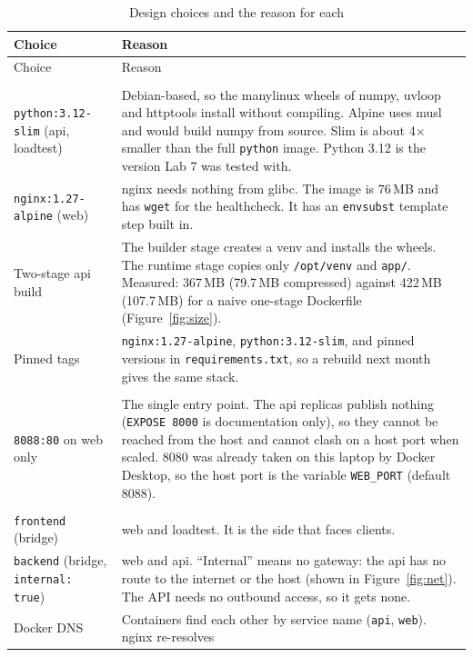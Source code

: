 \documentclass[11pt,a4paper]{article}
\begin{document}
{\small
\begin{xltabular}{\linewidth}{@{}>{\raggedright\arraybackslash}p{3.3cm}L@{}}
\caption{Design choices and the reason for each}\\
\toprule
Choice & Reason \\
\midrule
\endfirsthead
\toprule
Choice & Reason \\
\midrule
\endhead
{} \\
\texttt{python:3.12-slim} (api, loadtest) & Debian-based, so the manylinux wheels of numpy, uvloop and httptools install
  without compiling. Alpine uses musl and would build numpy from source. Slim is about 4$\times$ smaller than the full
  \texttt{python} image. Python 3.12 is the version Lab 7 was tested with. \\
\texttt{nginx:1.27-alpine} (web) & nginx needs nothing from glibc. The image is 76\,MB and has \texttt{wget} for the
  healthcheck. It has an \texttt{envsubst} template step built in. \\
Two-stage api build & The builder stage creates a venv and installs the wheels. The runtime stage copies only
  \texttt{/opt/venv} and \texttt{app/}. Measured: 367\,MB (79.7\,MB compressed) against 422\,MB (107.7\,MB) for a naive one-stage
  Dockerfile (Figure~\ref{fig:size}). \\
Pinned tags & \texttt{nginx:1.27-alpine}, \texttt{python:3.12-slim}, and pinned versions in
  \texttt{requirements.txt}, so a rebuild next month gives the same stack. \\
\midrule
{} \\
\texttt{8088:80} on web only & The single entry point. The api replicas publish nothing (\texttt{EXPOSE 8000} is
  documentation only), so they cannot be reached from the host and cannot clash on a host port when scaled. 8080 was
  already taken on this laptop by Docker Desktop, so the host port is the variable \texttt{WEB\_PORT} (default 8088). \\
\midrule
{} \\
\texttt{frontend} (bridge) & web and loadtest. It is the side that faces clients. \\
\texttt{backend} (bridge, \texttt{internal: true}) & web and api. ``Internal'' means no gateway: the api has no
  route to the internet or the host (shown in Figure~\ref{fig:net}). The API needs no outbound access, so it gets
  none. \\
Docker DNS & Containers find each other by service name (\texttt{api}, \texttt{web}). nginx re-resolves

\end{xltabular}}
\end{document}
